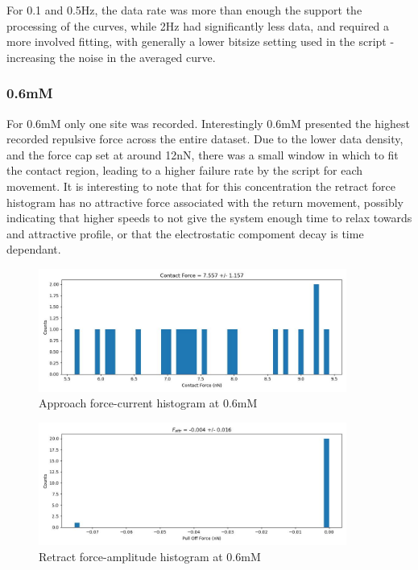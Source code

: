 For 0.1 and 0.5Hz, the data rate was more than enough the support the processing of the curves, while 2Hz had significantly less data, and required a more involved fitting, with generally a lower bitsize setting used in the script - increasing the noise in the averaged curve.


\subsubsection*{0.6mM}
For 0.6mM only one site was recorded. Interestingly 0.6mM presented the highest recorded repulsive force across the entire dataset. Due to the lower data density, and the force cap set at around 12nN, there was a small window in which to fit the contact region, leading to a higher failure rate by the script for each movement. It is interesting to note that for this concentration the retract force histogram has no attractive force associated with the return movement, possibly indicating that higher speeds to not give the system enough time to relax towards and attractive profile, or that the electrostatic compoment decay is time dependant.
\begin{figure}[h!]
\centering
\includegraphics[width=0.9\textwidth]{chapter7/Tip speed/0.6mM/approach_f_c_hist.jpg}
\caption{Approach force-current histogram at 0.6mM}
\end{figure}

\begin{figure}[h!]
\centering
\includegraphics[width=0.9\textwidth]{chapter7/Tip speed/0.6mM/retract_f_a_hist.jpg}
\caption{Retract force-amplitude histogram at 0.6mM}
\end{figure}

